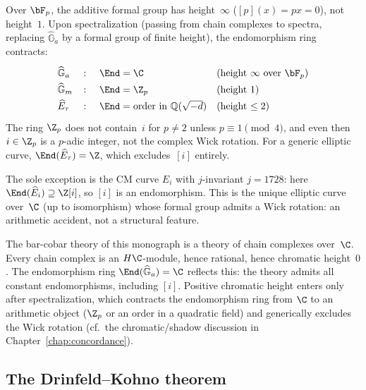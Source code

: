 \begin{remark}
\label{rem:spectralization-contraction}
\ClaimStatusHeuristic
{}
Over $\bF_p$, the additive formal group has
height~$\infty$ ($[p](x) = px = 0$), not height~$1$.
Upon spectralization (passing from chain complexes to spectra,
replacing $\widehat{\mathbb{G}}_a$ by a formal group of finite
height), the endomorphism ring contracts:
\[
\renewcommand{\arraystretch}{1.4}
\begin{array}{@{}lcll@{}}
\widehat{\mathbb{G}}_a & \colon &
 \End = \C & \text{(height $\infty$ over $\bF_p$)} \\
\widehat{\mathbb{G}}_m & \colon &
 \End = \Z_p & \text{(height $1$)} \\
\widehat{E}_\tau & \colon &
 \End = \text{order in } \mathbb{Q}(\sqrt{-d})
 & \text{(height $\leq 2$)}
\end{array}
\]
The ring $\Z_p$ does not contain~$i$ for $p \neq 2$ unless
$p \equiv 1 \pmod{4}$, and even then $i \in \Z_p$ is a
$p$-adic integer, not the complex Wick rotation.
For a generic elliptic curve, $\End(\widehat{E}_\tau) = \Z$,
which excludes~$[i]$ entirely.

The sole exception is the CM curve $E_i$ with $j$-invariant
$j = 1728$: here $\End(\widehat{E}_i) \supseteq \Z[i]$, so $[i]$
is an endomorphism. This is the unique elliptic curve
over~$\C$ (up to isomorphism) whose formal group admits a Wick
rotation: an arithmetic accident, not a structural feature.

The bar-cobar theory of this monograph is a theory of
chain complexes over~$\C$. Every chain complex is an
$H\C$-module, hence rational, hence chromatic height~$0$.
The endomorphism ring $\End(\widehat{\mathbb{G}}_a) = \C$ reflects
this: the theory admits all constant endomorphisms, including
$[i]$. Positive chromatic height enters only after
spectralization, which contracts the endomorphism ring from $\C$
to an arithmetic object ($\Z_p$ or an order in a quadratic
field) and generically excludes the Wick rotation
(cf.\ the chromatic/shadow discussion in Chapter~\ref{chap:concordance}).
\end{remark}

\subsection{The Drinfeld--Kohno theorem}
\label{sec:drinfeld-kohno}

